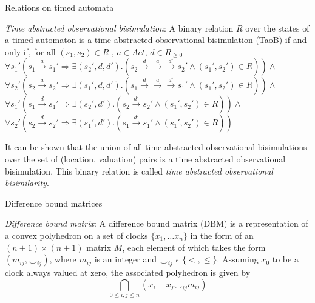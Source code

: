 \documentclass{beamer}
\begin{document}
\begin{frame}{Relations on timed automata}
\begin{definition} \label{def:taob} \emph{Time abstracted observational bisimulation}: A binary relation
  $R$ over the states of a timed automaton is a time abstracted
  observational bisimulation (TaoB) if and only if, for all
  $(s_1, s_2) \in R$ , $a \in Act$, $d \in R_{\ge 0}$\\
  $\forall s_1' (s_1 \xrightarrow{a} s_1' \Rightarrow \exists (s_2',
  d, d') . (s_2 \xrightarrow{d} \xrightarrow{a} \xrightarrow{d'} s_2'
  \wedge (s_1', s_2') \in R ) ) \wedge $ \\
  $\forall s_2' (s_2 \xrightarrow{a} s_2' \Rightarrow \exists (s_1',
  d, d') . (s_1 \xrightarrow{d} \xrightarrow{a} \xrightarrow{d'} s_1'
  \wedge (s_1', s_2') \in R ) ) \wedge $ \\
  $\forall s_1' (s_1 \xrightarrow{d} s_1' \Rightarrow \exists (s_2',
  d')
  . (s_2 \xrightarrow{d'} s_2' \wedge (s_1', s_2') \in R ) )
  \wedge $ \\
  $\forall s_2' (s_2 \xrightarrow{d} s_2' \Rightarrow \exists (s_1', d')
  . (s_1 \xrightarrow{d'} s_1' \wedge (s_1', s_2') \in R ) ) $ \\
\end{definition}

It can be shown that
  the union of all time abstracted observational bisimulations over the
  set of (location, valuation) pairs is a time abstracted observational
  bisimulation. This binary relation is called \textit{time abstracted
    observational bisimilarity}.

\end{frame}

\begin{frame}{Difference bound matrices}
\begin{definition}
  \emph{Difference bound matrix}: A difference bound matrix (DBM) is a
  representation of a convex polyhedron on a set of clocks $\{x_{1},
  \ldots x_{n}\}$ in the form of an $(n+1) \times (n+1)$
  matrix $M$, each element of which takes the form $(m_{ij}, \smile
  _{ij})$, where $m_{ij}$ is an integer and $\smile_{ij}$ $\epsilon$
  $\{ <, \leq\}$. Assuming $x_0$ to be a clock always valued at zero,
  the associated polyhedron is given by
  \begin{displaymath}
    \bigcap_{0 \leq i, j \leq n}(x_{i} - x_{j} \smile_{ij} m_{ij})
  \end{displaymath}
\end{definition}
\end{frame}
\end{document}
